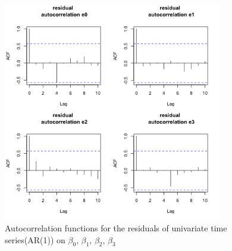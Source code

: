 \begin{figure}[!htb]
\centering
  \includegraphics[width=0.85\textwidth]{gfx/chapter-yc-insurance/forecasting_graph2}
\caption{Autocorrelation functions for the residuals of univariate time series(AR(1)) on $\beta_0$, $\beta_1$, $\beta_2$, $\beta_3$}
\label{forecast:3}       %
\end{figure}

